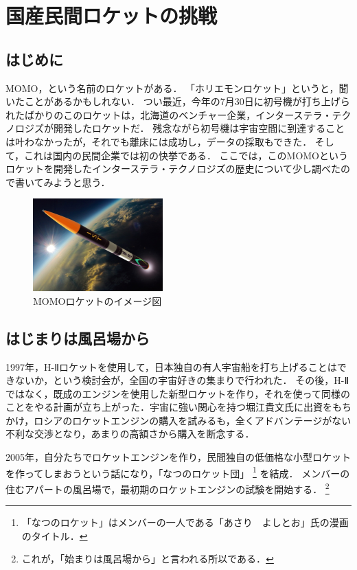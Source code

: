 \chapter{国産民間ロケットの挑戦}

\section{はじめに}
MOMO，という名前のロケットがある．
「ホリエモンロケット」というと，聞いたことがあるかもしれない．
つい最近，今年の7月30日に初号機が打ち上げられたばかりのこのロケットは，北海道のベンチャー企業，インターステラ・テクノロジズが開発したロケットだ．
残念ながら初号機は宇宙空間に到達することは叶わなかったが，それでも離床には成功し，データの採取もできた．
そして，これは国内の民間企業では初の快挙である．
ここでは，このMOMOというロケットを開発したインターステラ・テクノロジズの歴史について少し調べたので書いてみようと思う．

\begin{figure}[htbp]
\includegraphics[width=5cm]{img/momo-rocket-image}
\caption{MOMOロケットのイメージ図}
\end{figure}

\section{はじまりは風呂場から}
1997年，H-Ⅱロケットを使用して，日本独自の有人宇宙船を打ち上げることはできないか，という検討会が，全国の宇宙好きの集まりで行われた．
その後，H-Ⅱではなく，既成のエンジンを使用した新型ロケットを作り，それを使って同様のことをやる計画が立ち上がった．宇宙に強い関心を持つ堀江貴文氏に出資をもちかけ，ロシアのロケットエンジンの購入を試みるも，全くアドバンテージがない不利な交渉となり，あまりの高額さから購入を断念する．


2005年，自分たちでロケットエンジンを作り，民間独自の低価格な小型ロケットを作ってしまおうという話になり，「なつのロケット団」
\footnote{「なつのロケット」はメンバーの一人である「あさり　よしとお」氏の漫画のタイトル．}
を結成．
メンバーの住むアパートの風呂場で，最初期のロケットエンジンの試験を開始する．
\footnote{これが，「始まりは風呂場から」と言われる所以である．}

